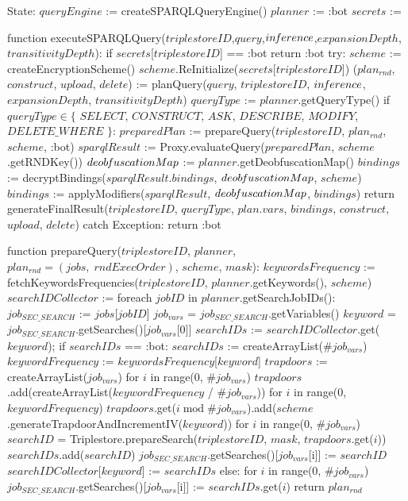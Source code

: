 State:
    $queryEngine$ := createSPARQLQueryEngine()
    $planner$ := :bot
    $secrets$ := {}

function executeSPARQLQuery($triplestoreID$,$query$,$in\textrm{\emph{f}}erence$,$expansionDepth$,$transitivityDepth$):
    if $secrets$[$triplestoreID$] == :bot
        return :bot
    try:
        $scheme$ := createEncryptionScheme()
        $scheme$.ReInitialize($secrets$[$triplestoreID$])
        ($plan_{rnd}$, $construct$, $upload$, $delete$) := planQuery($query$, $triplestoreID$, $in\textrm{\emph{f}}erence$, $expansionDepth$, $transitivityDepth$) 
        $queryType$ := $planner$.getQueryType()
        if $queryType \in \{$ $SELECT$, $CONSTRUCT$, $ASK$, $DESCRIBE$, $MODIFY$, $DELETE\_WHERE$ $\}$:
            $preparedPlan$ := prepareQuery($triplestoreID$, $plan_{rnd}$, $scheme$, :bot)
            $sparqlResult$ := Proxy.evaluateQuery($preparedPlan$, $scheme$.getRNDKey())
            $deob\textrm{\emph{f}}uscationMap$ := $planner$.getDeobfuscationMap()
            $bindings$ := decryptBindings($sparqlResult$.$bindings$, $deob\textrm{\emph{f}}uscationMap$, $scheme$)
            $bindings$ := applyModifiers($sparqlResult$, $deob\textrm{\emph{f}}uscationMap$, $bindings$)
        return generateFinalResult($triplestoreID$, $queryType$, $plan$.$vars$, $bindings$, $construct$, $upload$, $delete$)
    catch Exception:
        return :bot

function prepareQuery($triplestoreID$, $planner$, $plan_{rnd} = (jobs, \; rndExecOrder)$, $scheme$, $mask$):
    $keywordsFrequency$ := fetchKeywordsFrequencies($triplestoreID$, $planner$.getKeywords(), $scheme$)
    $searchIDCollector$ := {}
    foreach $jobID$ in $planner$.getSearchJobIDs():
        $job_{SEC\_SEARCH}$ := $jobs$[$jobID$]
        $job_{vars}$ = $job_{SEC\_SEARCH}$.getVariables()
        $keyword$ = $job_{SEC\_SEARCH}$.getSearches()[$job_{vars}$[0]]
        $searchIDs$ := $searchIDCollector$.get($keyword$);
        if $searchIDs$ == :bot:
            $searchIDs$ := createArrayList($\#job_{vars}$)
            $keywordFrequency$ := $keywordsFrequency$[$keyword$]
            $trapdoors$ := createArrayList($job_{vars}$)
            for $i$ in range(0, $\#job_{vars}$)
                $trapdoors$.add(createArrayList($keywordFrequency$ / $\#job_{vars}$))
            for $i$ in range(0, $keywordFrequency$)
                $trapdoors$.get($i \; \textrm{mod} \; \#job_{vars}$).add($scheme$.generateTrapdoorAndIncrementIV($keyword$))
            for $i$ in range(0, $\#job_{vars}$)
                $searchID$ = Triplestore.prepareSearch($triplestoreID$, $mask$, $trapdoors$.get($i$))
                $searchIDs$.add($searchID$)
                $job_{SEC\_SEARCH}$.getSearches()[$job_{vars}$[i]] := $searchID$
            $searchIDCollector$[$keyword$] := $searchIDs$
        else:
            for $i$ in range(0, $\#job_{vars}$)
                $job_{SEC\_SEARCH}$.getSearches()[$job_{vars}$[i]] := $searchIDs$.get($i$)
    return $plan_{rnd}$

